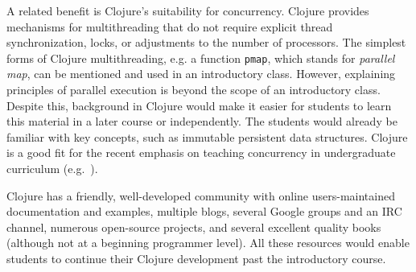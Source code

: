 \documentclass[submission,copyright,creativecommons]{eptcs}
\newcommand{\allcomments}[1]{{#1}}
\newcommand{\elenacomment}[1]{{\bf \textcolor{ForestGreen}{\allcomments{{#1}}}}}
\newcommand{\stephencomment}[1]{{\bf \color{StephensBlue}{\allcomments{{#1}}}}} %
\newcommand{\joecomment}[1]{{\bf \color{JoesGold}{\allcomments{{#1}}}}}
\newcommand{\clocode}[1]{{\tt {#1}}}
\begin{document}
A related benefit is Clojure's suitability for concurrency. Clojure provides mechanisms for multithreading that do not require explicit thread synchronization,  locks, 
or adjustments to the number of processors. The simplest forms of Clojure multithreading, e.g. a function \clocode{pmap}, which stands for {\it parallel map}, can be mentioned and used in an introductory class. However, explaining principles of parallel execution is beyond the scope of an introductory class. Despite this, background in Clojure would make it easier for students to learn this material in a later course or independently.%
The students would already be familiar with key concepts, such as immutable persistent data structures. Clojure is a good fit for the recent 
emphasis on teaching concurrency in undergraduate curriculum (e.g.~\cite{Brown:2010}). 

Clojure has a friendly, well-developed
community with online users-maintained 
documentation and examples, multiple blogs, several Google groups and an IRC channel, numerous open-source projects, and several excellent quality books (although not at a beginning programmer level). All these resources would enable students to continue their Clojure development past the introductory course. 
\end{document}
